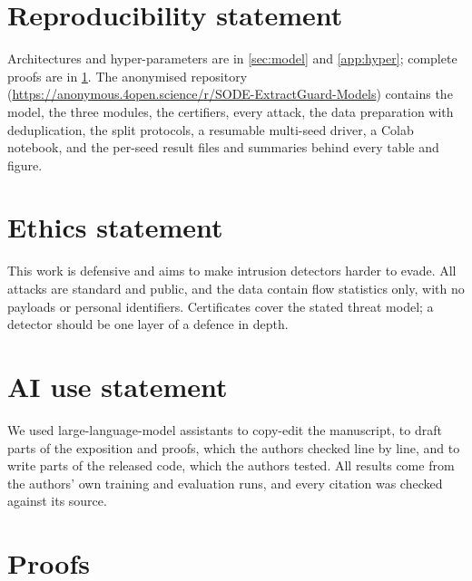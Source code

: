 \documentclass{article}
\newcommand{\anonrepo}{\url{https://anonymous.4open.science/r/SODE-ExtractGuard-Models}}
\theoremstyle{definition}
\begin{document}
\section*{Reproducibility statement}
Architectures and hyper-parameters are in \cref{sec:model} and \cref{app:hyper};
complete proofs are in \cref{app:proofs}. The anonymised repository (\anonrepo)
contains the model, the three modules, the certifiers, every attack, the data
preparation with deduplication, the split protocols, a resumable multi-seed
driver, a Colab notebook, and the per-seed result files and summaries behind
every table and figure.

\section*{Ethics statement}
This work is defensive and aims to make intrusion detectors harder to evade. All
attacks are standard and public, and the data contain flow statistics only, with
no payloads or personal identifiers. Certificates cover the stated threat model;
a detector should be one layer of a defence in depth.

\section*{AI use statement}
We used large-language-model assistants to copy-edit the manuscript, to draft
parts of the exposition and proofs, which the authors checked line by line, and
to write parts of the released code, which the authors tested. All results come
from the authors' own training and evaluation runs, and every citation was
checked against its source.




\newpage
\appendix

\section{Proofs}\label{app:proofs}
\end{document}
